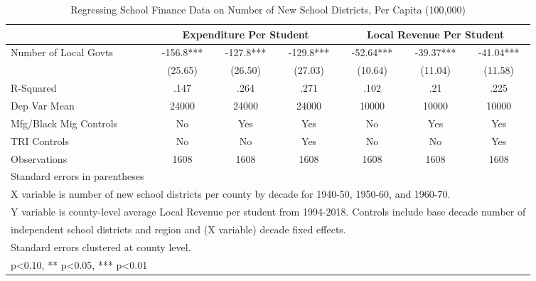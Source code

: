 \begin{table}[htbp]\centering
\def\sym#1{\ifmmode^{#1}\else\(^{#1}\)\fi}
\caption{Regressing School Finance Data on Number of New School Districts, Per Capita (100,000)}
\begin{tabular}{l*{6}{c}}
\toprule
                &\multicolumn{3}{c}{Expenditure Per Student}&\multicolumn{3}{c}{Local Revenue Per Student}\\\cmidrule(lr){2-4}\cmidrule(lr){5-7}
\midrule
Number of Local Govts&   -156.8***&   -127.8***&   -129.8***&   -52.64***&   -39.37***&   -41.04***\\
                &  (25.65)   &  (26.50)   &  (27.03)   &  (10.64)   &  (11.04)   &  (11.58)   \\
\midrule
R-Squared       &     .147   &     .264   &     .271   &     .102   &      .21   &     .225   \\
Dep Var Mean    &    24000   &    24000   &    24000   &    10000   &    10000   &    10000   \\
Mfg/Black Mig Controls&       No   &      Yes   &      Yes   &       No   &      Yes   &      Yes   \\
TRI Controls    &       No   &       No   &      Yes   &       No   &       No   &      Yes   \\
Observations    &     1608   &     1608   &     1608   &     1608   &     1608   &     1608   \\
\bottomrule
\multicolumn{7}{l}{\footnotesize Standard errors in parentheses}\\
\multicolumn{7}{l}{\footnotesize X variable is number of new school districts per county by decade for 1940-50, 1950-60, and 1960-70.}\\
\multicolumn{7}{l}{\footnotesize Y variable is county-level average Local Revenue per student from 1994-2018. Controls include base decade number of }\\
\multicolumn{7}{l}{\footnotesize independent school districts and region and (X variable) decade fixed effects.}\\
\multicolumn{7}{l}{\footnotesize Standard errors clustered at county level.}\\
\multicolumn{7}{l}{\footnotesize * p<0.10, ** p<0.05, *** p<0.01}\\
\end{tabular}
\end{table}
